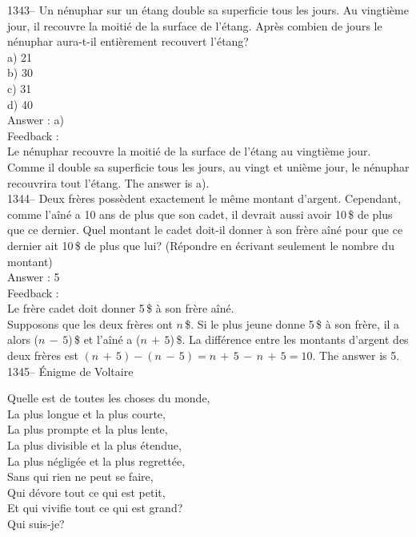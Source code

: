 ﻿\documentclass[letterpaper, 12pt]{article}
\begin{document}
1343-- Un n\'enuphar sur un \'etang double sa superficie tous les jours.  Au
vingti\`eme jour, il recouvre la moiti\'e de la surface de l'\'etang.
Apr\`es combien de jours le n\'enuphar aura-t-il enti\`erement recouvert
l'\'etang?\\
a) 21\\
b) 30\\
c) 31\\
d) 40\\

Answer : a)\\

Feedback : \\
Le n\'enuphar recouvre la moiti\'e de la surface de l'\'etang au vingti\`eme
jour.  Comme il double sa superficie tous les jours, au vingt et uni\`eme
jour, le n\'enuphar recouvrira tout l'\'etang.  The answer is a).\\

1344-- Deux fr\`eres poss\`edent exactement le m\^eme montant d'argent.
Cependant, comme l'a\^in\'e a 10 ans de plus que son cadet, il devrait aussi
avoir 10\,\$ de plus que ce dernier. Quel montant le cadet doit-il donner
\`a son fr\`ere a\^in\'e pour que ce dernier ait 10\,\$ de plus que lui?
(R\'epondre en \'ecrivant seulement le nombre du montant)\\

Answer : 5\\

Feedback : \\
Le fr\`ere cadet doit donner 5\,\$ \`a son fr\`ere a\^in\'e.  \\
Supposons que les deux fr\`eres ont $n$\,\$.  Si le plus jeune donne 5\,\$
\`a son fr\`ere, il a alors ($n\,-\,5$)\,\$ et l'a\^in\'e a ($n\,+\,5$)\,\$.
  La diff\'erence entre les montants d'argent des deux fr\`eres est
$(n\,+\,5)-(n\,-\,5)=n\,+\,5\,-\,n\,+\,5=10$.  The answer is 5.\\

1345-- \'Enigme de Voltaire\\
\begin{center}{Quelle est de toutes les choses du monde,\\
La plus longue et la plus courte,\\
La plus prompte et la plus lente,\\
La plus divisible et la plus \'etendue,\\
La plus n\'eglig\'ee et la plus regrett\'ee,\\
Sans qui rien ne peut se faire,\\
Qui d\'evore tout ce qui est petit,\\
Et qui vivifie tout ce qui est grand?\\
Qui suis-je?\\}
\end{center}
\end{document}
